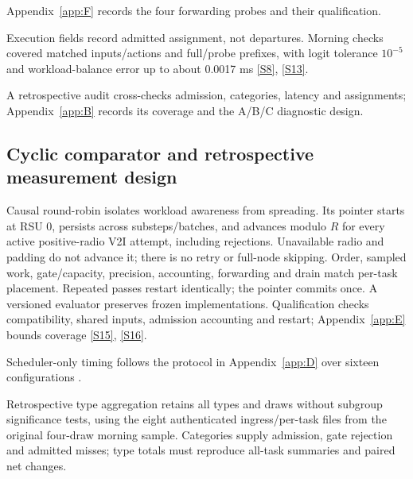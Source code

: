 \documentclass[12pt,a4paper]{article}
\begin{document}
Appendix~\ref{app:F} records the four forwarding probes and their qualification.

Execution fields record admitted assignment, not departures. Morning checks covered matched inputs/actions and full/probe prefixes, with logit tolerance $10^{-5}$ and workload-balance error up to about 0.0017 ms \hyperref[source-s8]{[S8]}, \hyperref[source-s13]{[S13]}.

A retrospective audit cross-checks admission, categories, latency and assignments; Appendix~\ref{app:B} records its coverage and the A/B/C diagnostic design.

\FloatBarrier
\subsection{Cyclic comparator and retrospective measurement design}\label{sec:2.8}

Causal round-robin isolates workload awareness from spreading. Its pointer starts at RSU 0, persists across substeps/batches, and advances modulo $R$ for every active positive-radio V2I attempt, including rejections. Unavailable radio and padding do not advance it; there is no retry or full-node skipping. Order, sampled work, gate/capacity, precision, accounting, forwarding and drain match per-task placement. Repeated passes restart identically; the pointer commits once. A versioned evaluator preserves frozen implementations. Qualification checks compatibility, shared inputs, admission accounting and restart; Appendix~\ref{app:E} bounds coverage \hyperref[source-s15]{[S15]}, \hyperref[source-s16]{[S16]}.

Scheduler-only timing follows the protocol in Appendix~\ref{app:D} over sixteen configurations \cite{ref35}.

Retrospective type aggregation retains all types and draws without subgroup significance tests, using the eight authenticated ingress/per-task files from the original four-draw morning sample. Categories supply admission, gate rejection and admitted misses; type totals must reproduce all-task summaries and paired net changes.
\end{document}
